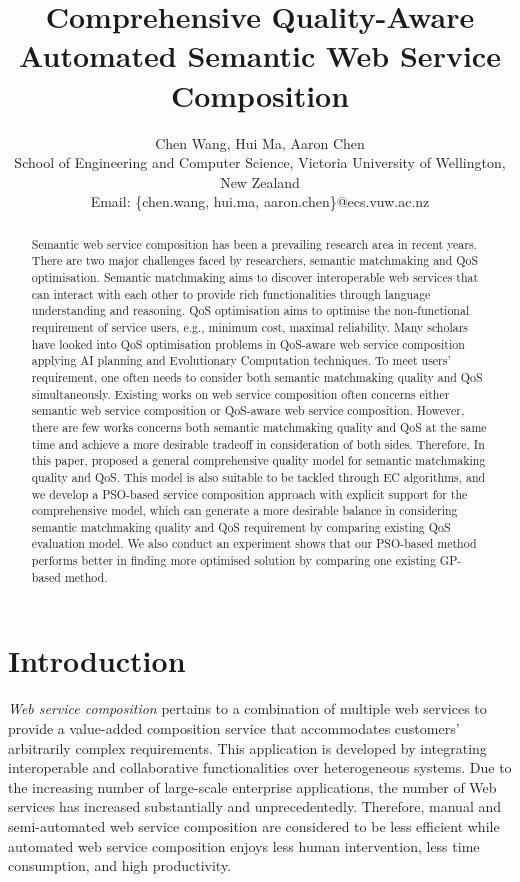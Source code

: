 \documentclass{IEEEtran}
\title{Comprehensive Quality-Aware Automated Semantic Web Service Composition}
\author{Chen Wang, Hui Ma, Aaron Chen\\ \small School of
Engineering and Computer Science, Victoria University of Wellington, New Zealand\\
Email: \{chen.wang, hui.ma, aaron.chen\}@ecs.vuw.ac.nz}
\begin{document}
\maketitle
\begin{abstract}
Semantic web service composition has been a prevailing research area in recent years. There are two major challenges faced by researchers, semantic matchmaking and QoS optimisation. Semantic matchmaking aims to discover interoperable web services that can interact with each other to provide rich functionalities through language understanding and reasoning. QoS optimisation aims to optimise the non-functional requirement of service users, e.g., minimum cost, maximal reliability. Many scholars have looked into QoS optimisation problems in QoS-aware web service composition applying AI planning and Evolutionary Computation techniques. To meet users' requirement, one often needs to consider both semantic matchmaking quality and QoS simultaneously. Existing works on web service composition often concerns either semantic web  service composition or QoS-aware web service composition. However, there are few works concerns both semantic matchmaking quality and QoS at the same time and achieve a more desirable tradeoff in consideration of both sides. Therefore, In this paper, proposed a general comprehensive quality model for semantic matchmaking quality and QoS. This model is also suitable to be tackled through EC algorithms, and we develop a PSO-based service composition approach with explicit support for the comprehensive model, which can generate a more desirable balance in considering semantic matchmaking quality and QoS requirement by comparing existing QoS evaluation model. We also conduct an experiment shows that our PSO-based method performs better in finding more optimised solution by comparing one existing GP-based method.

\end{abstract}
\section{Introduction}\label{introduction}

\textit{Web service composition} pertains to a combination of multiple web services to provide a value-added composition service that accommodates customers' arbitrarily complex requirements. This application is developed by integrating interoperable and collaborative functionalities over heterogeneous systems. Due to the increasing number of large-scale enterprise applications, the number of Web services has increased substantially and unprecedentedly. Therefore, manual and semi-automated web service composition are considered to be less efficient while automated web service composition enjoys less human intervention, less time consumption, and high productivity.
\end{document}
